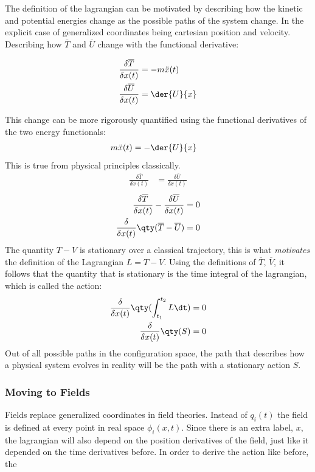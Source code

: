 The definition of the lagrangian can be motivated by describing how the kinetic and potential energies change as the possible paths of the system change. In the explicit case of generalized coordinates being cartesian position and velocity. Describing how \(\overline{T}\) and \(\overline{U}\) change with the functional derivative:

\begin{align*}
	\frac{\delta\overline{T}}{\delta x(t)}
	&=-m\ddot{x}(t)
	\\
	\frac{\delta\overline{U}}{\delta x(t)}
	&=\der{U}{x}
\end{align*}

This change can be more rigorously quantified using the functional derivatives of the two energy functionals: 
\begin{align*}
	m\ddot{x}(t)
	&=-\der{U}{x}
\end{align*}
This is true from physical principles classically.
\begin{align*}
	\frac{\delta\overline{T}}{\delta x(t)}
	&=\frac{\delta\overline{U}}{\delta x(t)}
\end{align*}
\begin{align*}
	\frac{\delta\overline{T}}{\delta x(t)}-\frac{\delta\overline{U}}{\delta x(t)}
	&=0
	\\
	\frac{\delta}{\delta x(t)}\qty(\overline{T}-\overline{U})&=0
\end{align*}
The quantity \(T-V\) is stationary over a classical trajectory, this is what \textit{motivates} the definition of the Lagrangian \(L=T-V\). Using the definitions of \(\overline{T},\,\overline{V}\), it follows that the quantity that is stationary is the time integral of the lagrangian, which is called the action:
\begin{align*}
	\frac{\delta}{\delta x(t)}\qty(\int_{t_1}^{t_2}L\dt)&=0
	\\
	\frac{\delta}{\delta x(t)}\qty(S)&=0
\end{align*}
Out of all possible paths in the configuration space, the path that describes how a physical system evolves in reality will be the path with a stationary action \(S\).


\subsubsection{Moving to Fields}
Fields replace generalized coordinates in field theories.
Instead of \(q_i(t)\) the field is defined at every point in real space \(\phi_i(x,t)\).
Since there is an extra label, \(x\), the lagrangian will also depend on the position derivatives of the field, just like it depended on the time derivatives before. In order to derive the action like before, the 